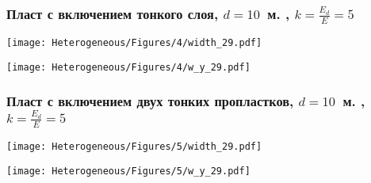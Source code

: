 \begin{frame}
    \frametitle{Пласт с включением тонкого слоя, $d=10$~м. , $k=\frac{E_d}{E}=5$}
    \begin{minipage}[t]{0.4\linewidth}
        \texttt{[image: Heterogeneous/Figures/4/width\_29.pdf]}
    \end{minipage}
    \hfill
    \begin{minipage}[t]{0.57\linewidth}
        \texttt{[image: Heterogeneous/Figures/4/w\_y\_29.pdf]}
    \end{minipage}
\end{frame}

\begin{frame}
    \frametitle{Пласт с включением двух тонких пропластков, $d=10$~м. , $k=\frac{E_d}{E}=5$}
    \begin{minipage}[t]{0.4\linewidth}
        \texttt{[image: Heterogeneous/Figures/5/width\_29.pdf]}
    \end{minipage}
    \hfill
    \begin{minipage}[t]{0.57\linewidth}
        \texttt{[image: Heterogeneous/Figures/5/w\_y\_29.pdf]}
    \end{minipage}
\end{frame}